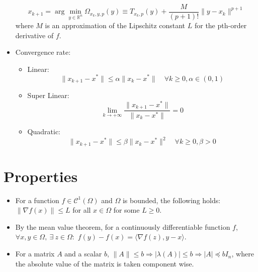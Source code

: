 \documentclass[12pt, openany]{report}
\newcommand{\R}{\mathbb{R}}
\newcommand{\C}{\mathcal{C}}
\theoremstyle{definition}
\begin{document}
\begin{itemize}
	\begin{equation}
		x_{k+1} = \arg\min_{y\in \R^n} \Omega_{x_k,y,p}(y) \equiv T_{x_k,p}(y) + \frac{M}{(p+1)!}\|y-x_k\|^{p+1}
	\end{equation}
	where $M$ is an approximation of the Lipschitz constant $L$ for the pth-order derivative of $f$.
	\item Convergence rate: 
	\begin{itemize}
		\item Linear:
		\begin{equation}\label{eq:linear_convergence_rate}
			\|x_{k+1}-x^*\| \leq \alpha \|x_k-x^*\| \quad \forall k\geq 0, \alpha \in (0,1)
		\end{equation}
		\item Super Linear:
		\begin{equation}\label{eq:super_linear_convergence_rate}
			\lim_{k \to +\infty} \frac{\|x_{k+1}-x^*\|}{\|x_k-x^*\|} = 0
		\end{equation}
		\item Quadratic:
		\begin{equation}\label{eq:quadratic_convergence_rate}
			\|x_{k+1}-x^*\| \leq \beta \|x_k-x^*\|^2 \quad \forall k\geq 0, \beta > 0
		\end{equation}
	\end{itemize}
\end{itemize}
\section{Properties}
\begin{itemize}
	\item For a function $f\in \C^1(\Omega)$ and $\Omega$ is bounded, the following holds: $\lVert \nabla f(x)\rVert \le L$ for all $x\in \Omega$ for some $L\ge 0$.
	\item By the mean value theorem, for a continuously differentiable function $f$, $\forall x,y\in \Omega,\: \exists \ z\in \Omega:$ $f(y)-f(x) = \langle \nabla f(z),y-x\rangle$.
	\item For a matrix $A$ and a scalar $b$, $\lVert A\rVert \le b\Longrightarrow |\lambda (A)|\le b \Longrightarrow |A| \preceq bI_n$, where the absolute value of the matrix is taken component wise. 
\end{itemize}
\end{document}
